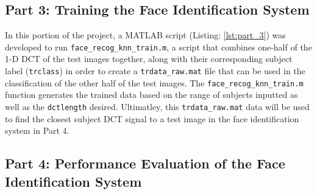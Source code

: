 \documentclass[conference]{IEEEtran}
\begin{document}
\subsection{Part 3: Training the Face Identification System}

In this portion of the project, a MATLAB\texttrademark{} script (Listing:
\ref{lst:part_3}) was developed to run \texttt{face\_recog\_knn\_train.m}, a
script that combines one-half of the 1-D DCT of the test images together, along
with their corresponding subject label (\texttt{trclass}) in order to create a
\texttt{trdata\_raw.mat} file that can be used in the classification of the
other half of the test images. The \texttt{face\_recog\_knn\_train.m} function
generates the trained data based on the range of subjects inputted as well as
the \texttt{dctlength} desired. Ultimatley, this \texttt{trdata\_raw.mat} data
will be used to find the closest subject DCT signal to a test image in the face
identification system in Part 4.

\subsection{Part 4: Performance Evaluation of the Face Identification System}
\end{document}
